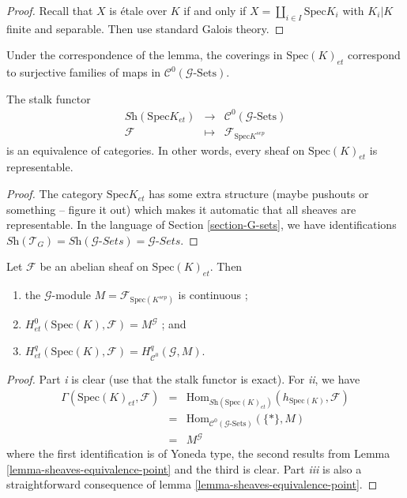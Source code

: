 \begin{proof}
Recall that $X$ is \'etale over $K$ if and only if  $X=\coprod_{i\in I} 
\text{Spec} K_i$ with $K_i | K$ finite and separable. Then use standard Galois 
theory.
\end{proof}

\begin{remark}
\label{remark-covering-surjective}
Under the correspondence of the lemma, the coverings in
$\text{Spec}(K)_{et}$  correspond to surjective families of maps in 
$\mathcal{C}^0(\mathcal{G}\text{-Sets})$. 
\end{remark}

\begin{lemma}
\label{lemma-sheaves-equivalence-point}
The stalk functor
$$
\begin{matrix}
\textit{Sh}(\text{Spec} K_{et}) & \longrightarrow & 
\mathcal{C}^0(\mathcal{G}\text{-Sets}) \\
\mathcal{F} & \longmapsto & \mathcal{F}_{\text{Spec} K^{sep}}
\end{matrix}
$$
is an equivalence of categories. In other words, every sheaf on 
$\text{Spec}(K)_{et}$ is representable.
\end{lemma}

\begin{proof}
The category $\text{Spec} K_{et}$ has some extra structure (maybe pushouts or 
something -- figure it out) which makes it automatic that all sheaves are 
representable. In the language of Section \ref{section-G-sets}, we have 
identifications $\textit{Sh}(\mathcal{T}_G) = 
\textit{Sh}(\mathcal{G}\textit{-Sets}) = \mathcal{G}\textit{-Sets}$.
\end{proof}

\begin{lemma}
\label{lemma-compare-cohomology-point}
Let $\mathcal{F}$ be an abelian sheaf on $\text{Spec}(K)_{et}$. Then
\begin{enumerate}
\item the $\mathcal{G}$-module $M = \mathcal{F}_{\text{Spec}(K^{sep})}$ is 
continuous ;
\item $H_{et}^0(\text{Spec}(K), \mathcal{F})=M^{\mathcal{G}}$ ; and
\item $H_{et}^q(\text{Spec}(K), \mathcal{F}) = H_{\mathcal{C}^0}^q(\mathcal{G}, 
M)$.
\end{enumerate}
\end{lemma}

\begin{proof}
Part {\it i} is clear (use that the stalk functor is exact). For {\it ii}, we 
have 
\begin{eqnarray*}
\Gamma(\text{Spec}(K)_{et}, \mathcal{F}) & = & 
\text{Hom}_{\textit{Sh}(\text{Spec}(K)_{et})}(h_{\text{Spec}(K)}, \mathcal{F})
\\
& = & \text{Hom}_{\mathcal{C}^0(\mathcal{G}\text{-Sets})}(\{*\}, M) \\
& = &  M^{\mathcal{G}}
\end{eqnarray*}
where the first identification is of Yoneda type, the second results from
Lemma \ref{lemma-sheaves-equivalence-point}
and the third is clear. Part {\it iii} is also a 
straightforward consequence of lemma \ref{lemma-sheaves-equivalence-point}.
\end{proof}

